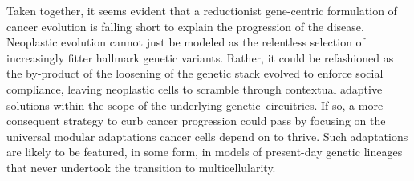 Taken together, it seems evident that a reductionist gene-centric formulation of
cancer evolution is falling short to explain the progression of the disease.
Neoplastic evolution cannot just be modeled as the relentless selection of
increasingly fitter hallmark genetic variants.  Rather, it could be refashioned
as the by-product of the loosening of the genetic stack evolved to enforce
social compliance, leaving neoplastic cells to scramble through contextual
adaptive solutions within the scope of the underlying genetic\ circuitries.  If
so, a more consequent strategy to curb cancer progression could pass by focusing
on the universal modular adaptations cancer cells depend on to thrive.  Such
adaptations are likely to be featured, in some form, in models of present-day
genetic lineages that never undertook the transition to multicellularity.







